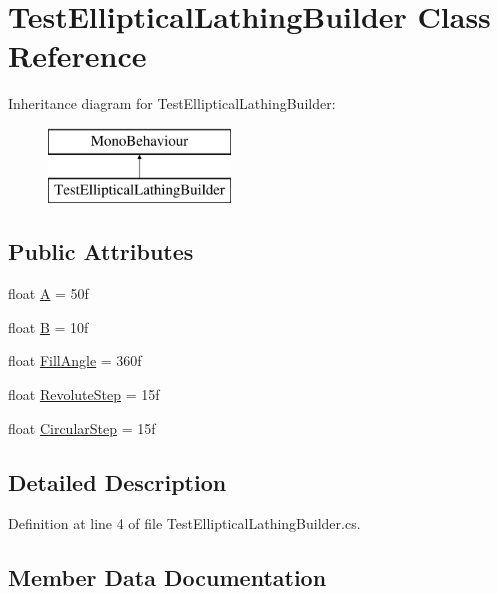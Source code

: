 \hypertarget{class_test_elliptical_lathing_builder}{}\section{Test\+Elliptical\+Lathing\+Builder Class Reference}
\label{class_test_elliptical_lathing_builder}
Inheritance diagram for Test\+Elliptical\+Lathing\+Builder\+:\begin{figure}[H]
\begin{center}
\leavevmode
\includegraphics[height=2.000000cm]{class_test_elliptical_lathing_builder}
\end{center}
\end{figure}
\subsection*{Public Attributes}
\begin{DoxyCompactItemize}
\item 
float \mbox{\hyperlink{class_test_elliptical_lathing_builder_ab6b1c9aebd9dd32313d1fc128ec7cec6}{A}} = 50f
\item 
float \mbox{\hyperlink{class_test_elliptical_lathing_builder_a13658559246698582df8ebf69e8e8b49}{B}} = 10f
\item 
float \mbox{\hyperlink{class_test_elliptical_lathing_builder_a25af2bfd880dbd8db4d04d524d6a8d66}{Fill\+Angle}} = 360f
\item 
float \mbox{\hyperlink{class_test_elliptical_lathing_builder_a679c335a5fed7101e459c2c03818a5b4}{Revolute\+Step}} = 15f
\item 
float \mbox{\hyperlink{class_test_elliptical_lathing_builder_a9114338d9e50fea66dccff3549d83404}{Circular\+Step}} = 15f
\end{DoxyCompactItemize}


\subsection{Detailed Description}


Definition at line 4 of file Test\+Elliptical\+Lathing\+Builder.\+cs.



\subsection{Member Data Documentation}
\mbox{\label{class_test_elliptical_lathing_builder_ab6b1c9aebd9dd32313d1fc128ec7cec6}} 
